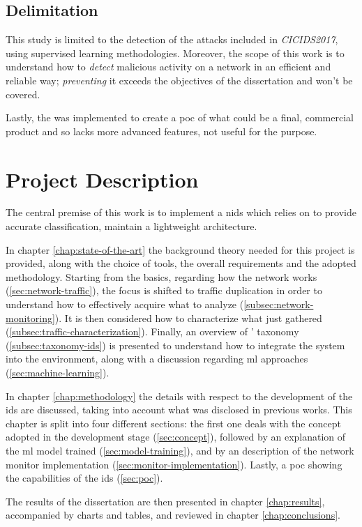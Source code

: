 
\subsection{Delimitation}
\label{subsec:delimitation}

This study is limited to the detection of the attacks included in \textit{CICIDS2017}, using supervised learning methodologies. Moreover, the scope of this work is to understand how to \textit{detect} malicious activity on a network in an efficient and reliable way; \textit{preventing} it exceeds the objectives of the dissertation and won't be covered.
\par Lastly, the  was implemented to create a \gls{poc} of what could be a final, commercial product and so lacks more advanced features, not useful for the purpose.


\section{Project Description}
\label{sec:proj-description}

The central premise of this work is to implement a \gls{nids} which relies on  to provide accurate classification, maintain a lightweight architecture.
\par In chapter \ref{chap:state-of-the-art} the background theory needed for this project is provided, along with the choice of tools, the overall requirements and the adopted methodology. Starting from the basics, regarding how the network works (\ref{sec:network-traffic}), the focus is shifted to traffic duplication in order to understand how to effectively acquire what to analyze (\ref{subsec:network-monitoring}). It is then considered how to characterize what just gathered (\ref{subsec:traffic-characterization}). Finally, an overview of ' taxonomy (\ref{subsec:taxonomy-ids}) is presented to understand how to integrate the system into the environment, along with a discussion regarding \gls{ml} approaches (\ref{sec:machine-learning}).
\par In chapter \ref{chap:methodology} the details with respect to the development of the \gls{ids} are discussed, taking into account what was disclosed in previous works. This chapter is split into four different sections: the first one deals with the concept adopted in the development stage (\ref{sec:concept}), followed by an explanation of the \gls{ml} model trained (\ref{sec:model-training}), and by an description of the network monitor implementation (\ref{sec:monitor-implementation}). Lastly, a \gls{poc} showing the capabilities of the \gls{ids} (\ref{sec:poc}). 
\par The results of the dissertation are then presented in chapter \ref{chap:results}, accompanied by charts and tables, and reviewed in chapter \ref{chap:conclusions}. 